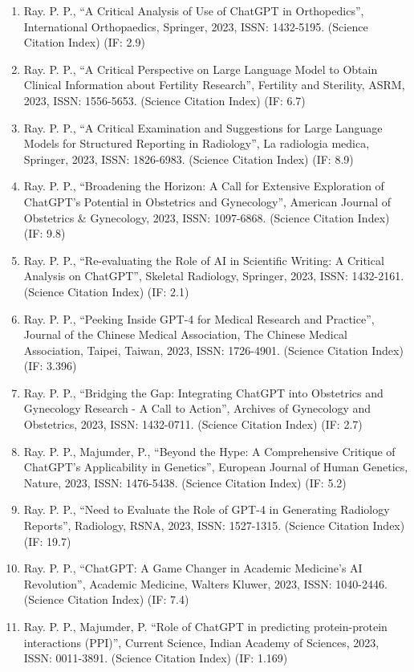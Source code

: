 \documentclass[11pt,a4paper]{moderncv}
\begin{document}
\begin{adjustwidth}{6em}{0pt}
\begin{enumerate}
		\item Ray. P. P., “A Critical Analysis of Use of ChatGPT in Orthopedics”, International Orthopaedics, Springer, 2023, ISSN: 1432-5195. (Science Citation Index) (IF: 2.9)
		\item Ray. P. P., “A Critical Perspective on Large Language Model to Obtain Clinical Information about Fertility Research”, Fertility and Sterility, ASRM, 2023, ISSN: 1556-5653. (Science Citation Index) (IF: 6.7)
		\item Ray. P. P., “A Critical Examination and Suggestions for Large Language Models for Structured Reporting in Radiology”, La radiologia medica, Springer, 2023, ISSN: 1826-6983. (Science Citation Index) (IF: 8.9)
		\item Ray. P. P., “Broadening the Horizon: A Call for Extensive Exploration of ChatGPT's Potential in Obstetrics and Gynecology”, American Journal of Obstetrics \& Gynecology, 2023, ISSN: 1097-6868. (Science Citation Index) (IF: 9.8)
		\item Ray. P. P., “Re-evaluating the Role of AI in Scientific Writing: A Critical Analysis on ChatGPT”, Skeletal Radiology, Springer, 2023, ISSN: 1432-2161. (Science Citation Index) (IF: 2.1)
		\item Ray. P. P., “Peeking Inside GPT-4 for Medical Research and Practice”, Journal of the Chinese Medical Association, The Chinese Medical Association, Taipei, Taiwan, 2023, ISSN: 1726-4901. (Science Citation Index) (IF: 3.396)
		\item Ray. P. P., “Bridging the Gap: Integrating ChatGPT into Obstetrics and Gynecology Research - A Call to Action”, Archives of Gynecology and Obstetrics, 2023, ISSN: 1432-0711. (Science Citation Index) (IF: 2.7)
		\item Ray. P. P., Majumder, P., “Beyond the Hype: A Comprehensive Critique of ChatGPT’s Applicability in Genetics”, European Journal of Human Genetics, Nature, 2023, ISSN: 1476-5438. (Science Citation Index) (IF: 5.2)
		\item Ray. P. P., “Need to Evaluate the Role of GPT-4 in Generating Radiology Reports”, Radiology, RSNA, 2023, ISSN: 1527-1315. (Science Citation Index) (IF: 19.7)
		\item Ray. P. P., “ChatGPT: A Game Changer in Academic Medicine's AI Revolution”, Academic Medicine, Walters Kluwer, 2023, ISSN: 1040-2446. (Science Citation Index) (IF: 7.4)
		\item Ray. P. P., Majumder, P. “Role of ChatGPT in predicting protein-protein interactions (PPI)”, Current Science, Indian Academy of Sciences, 2023, ISSN: 0011-3891. (Science Citation Index) (IF: 1.169)

\end{enumerate}
\end{adjustwidth}
\end{document}
